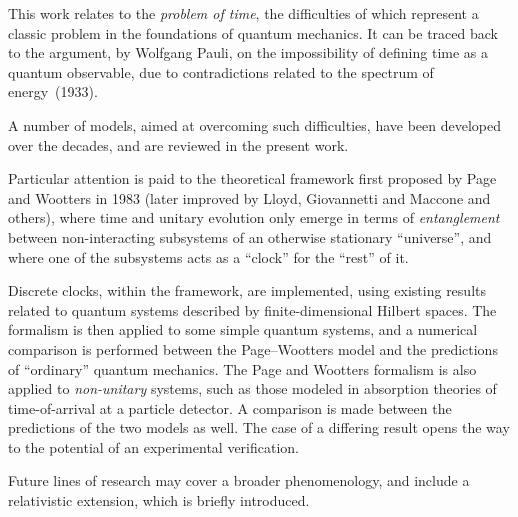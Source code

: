 This work relates to the
\emph{problem of time},
the difficulties of which
represent a classic problem in the foundations of quantum mechanics.
It can be traced back to
the argument, by Wolfgang Pauli,
on the impossibility of defining time as a quantum observable,
due to contradictions related to the spectrum of energy~(1933).

A number of models, aimed at overcoming such difficulties,
have been developed over the decades,
and are reviewed in the present work.

Particular attention is paid to
the theoretical framework first proposed by Page and Wootters in 1983
(later improved by Lloyd, Giovannetti and Maccone and others),
where time and unitary evolution only emerge in
terms of \emph{entanglement} between non-interacting subsystems
of an otherwise stationary ``universe'',
and where one of the subsystems acts as a ``clock'' for the ``rest'' of it.

{Discrete} clocks, within the framework, are implemented,
using
existing results related to quantum systems described by finite-dimensional Hilbert spaces.
The formalism is then applied to some simple quantum systems,
and a numerical comparison is performed between the Page--Wootters model and the predictions
of ``ordinary'' quantum mechanics.
The Page and Wootters formalism is also applied to \emph{non-unitary} systems,
such as those modeled in absorption theories of time-of-arrival at a particle detector.
A comparison is made between the predictions of the two models as well.
The case of a differing result
opens the way to the potential of an experimental verification.

Future lines of research may cover a broader phenomenology,
and include a relativistic extension,
which is briefly introduced.

